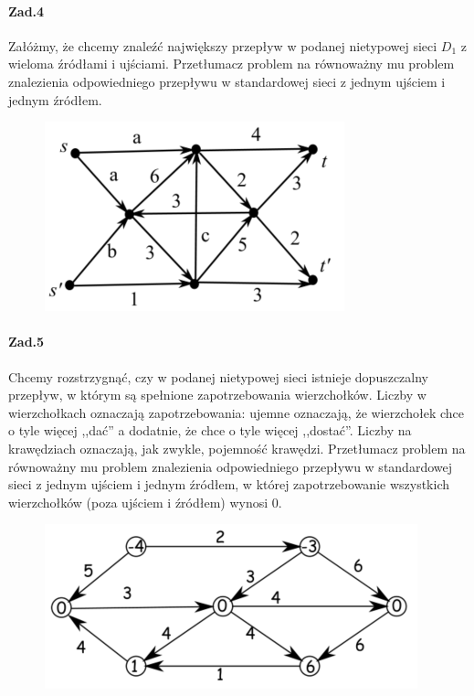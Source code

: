 \paragraph{Zad.4} Załóżmy, że chcemy znaleźć największy przepływ w podanej nietypowej sieci $D_1$ z wieloma źródłami i ujściami. Przetłumacz problem na równoważny mu problem znalezienia odpowiedniego przepływu w standardowej sieci z jednym ujściem i jednym źródłem.
\begin{figure}[H]
\centering
\includegraphics[width=.8\textwidth]{img/6_Z4}
\end{figure}

\paragraph{Zad.5} Chcemy rozstrzygnąć, czy w podanej nietypowej sieci istnieje dopuszczalny przepływ, w którym są spełnione zapotrzebowania wierzchołków. Liczby w wierzchołkach oznaczają zapotrzebowania: ujemne oznaczają, że wierzchołek chce o tyle więcej ,,dać” a dodatnie, że chce o tyle więcej ,,dostać”. Liczby na krawędziach oznaczają, jak zwykle, pojemność krawędzi. Przetłumacz problem na równoważny mu problem znalezienia odpowiedniego przepływu w standardowej sieci z jednym ujściem i jednym źródłem, w której zapotrzebowanie wszystkich wierzchołków (poza ujściem i źródłem) wynosi 0.
\begin{figure}[H]
\centering
\includegraphics[width=.8\textwidth]{img/6_Z5}
\end{figure}


